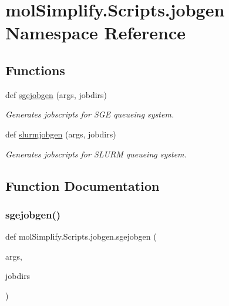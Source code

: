 \hypertarget{namespacemolSimplify_1_1Scripts_1_1jobgen}{}\section{mol\+Simplify.\+Scripts.\+jobgen Namespace Reference}
\label{namespacemolSimplify_1_1Scripts_1_1jobgen}
\subsection*{Functions}
\begin{DoxyCompactItemize}
\item 
def \hyperlink{namespacemolSimplify_1_1Scripts_1_1jobgen_a92f52daa6f2a5e2ac7545fd6e6779283}{sgejobgen} (args, jobdirs)
\begin{DoxyCompactList}\small\item\em Generates jobscripts for S\+GE queueing system. \end{DoxyCompactList}\item 
def \hyperlink{namespacemolSimplify_1_1Scripts_1_1jobgen_a7d74dcbceb75d7adbeb197f5260935c2}{slurmjobgen} (args, jobdirs)
\begin{DoxyCompactList}\small\item\em Generates jobscripts for S\+L\+U\+RM queueing system. \end{DoxyCompactList}\end{DoxyCompactItemize}


\subsection{Function Documentation}
\mbox{\label{namespacemolSimplify_1_1Scripts_1_1jobgen_a92f52daa6f2a5e2ac7545fd6e6779283}} 
\subsubsection{\texorpdfstring{sgejobgen()}{sgejobgen()}}
{\footnotesize\ttfamily def mol\+Simplify.\+Scripts.\+jobgen.\+sgejobgen (\begin{DoxyParamCaption}\item[{}]{args,  }\item[{}]{jobdirs }\end{DoxyParamCaption})}



